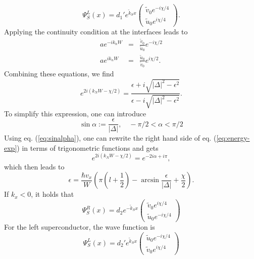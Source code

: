 \begin{equation}
 \Psi_S^L \left( x \right) = d_1' e^{ \tilde{k}_S x } \begin{pmatrix} \tilde{v}_0 e^{-i \chi / 4}\\ \tilde{u}_0 e^{i \chi / 4} \end{pmatrix}.
\end{equation}
Applying the continuity condition at the interfaces leads to
\begin{eqnarray}
a e^{-i k_n W} &=& \frac{\tilde{v}_0}{\tilde{u}_0} e^{-i \chi /2}  \\
a e^{i k_n W} &=& \frac{\tilde{u}_0}{\tilde{v}_0} e^{i \chi /2}.
\end{eqnarray}
Combining these equations, we find
\begin{equation}
e^{2i ( k_N W - \chi /2 )}  = \frac{\epsilon + i \sqrt{|\Delta|^2 - \epsilon^2 }}{ \epsilon - i \sqrt{|\Delta|^2 - \epsilon^2 } } \label{eq:energy-exp}.
\end{equation}
To simplify this expression, one can introduce 
\begin{equation}
\sin \alpha := \frac{\epsilon}{|\Delta|}, \quad - \pi / 2 < \alpha < \pi / 2\label{eq:sinalpha}
\end{equation}
Using eq. (\ref{eq:sinalpha}), one can rewrite the right hand side of eq. (\ref{eq:energy-exp}) in terms of trigonometric functions and gets
\begin{equation}
e^{2i ( k_N W - \chi /2 )} = e^{-2i \alpha + i \pi},
\end{equation}
which then leads to
\begin{equation}
\epsilon = \frac{\hbar v_x}{W} \left( \pi \left(l + \frac{1}{2} \right) - \arcsin \frac{\epsilon}{|\Delta|} + \frac{\chi}{2} \right).
\end{equation}
If $k_x < 0 $, it holds that
\begin{equation}
\Psi_S^R \left( x \right) = d_2 e^{ - \tilde{k}_S x } \begin{pmatrix} \tilde{v}_0 e^{i \chi/4} \\ \tilde{u}_0 e^{-i \chi/4} \end{pmatrix}
\end{equation}
For the left superconductor, the wave function is
\begin{equation}
\Psi_S^L \left( x \right)  = d_2' e^{ \tilde{k}_S x } \begin{pmatrix} \tilde{u}_0 e^{-i \chi / 4}\\ \tilde{v}_0 e^{i \chi / 4} \end{pmatrix}
\end{equation}
